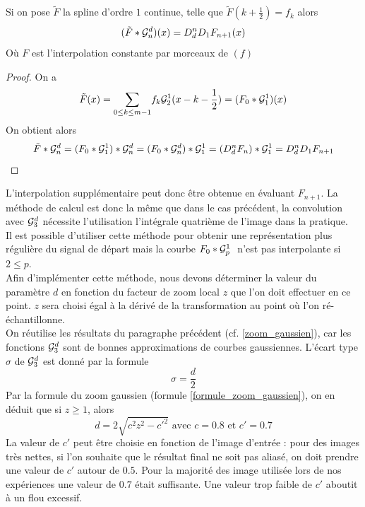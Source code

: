 \begin{prop}
Si on pose $\tilde{F}$ la spline d'ordre $1$ continue, telle que $\tilde{F}(k+\frac{1}{2})=f_k$ alors 
\begin{equation*}
( \tilde{F} * \mathcal{G}_n^d ) (x) = D_d^{n}D_1 F_{n+1}(x)
\end{equation*}
Où $F$ est l'interpolation constante par morceaux de $(f)$ 
\end{prop}
\begin{proof}
On a
\begin{equation*}
\tilde{F}(x)=\displaystyle{\sum_{0\le k \le m-1}} f_k \mathcal{G}_2^1 (x-k-\frac{1}{2})=(F_{0} *\mathcal{G}_1^1 )(x)
\end{equation*}
On obtient alors 
\begin{equation*}
\tilde{F}*\mathcal{G}_n^d=(F_{0}*\mathcal{G}_1^1)*\mathcal{G}_n^d=(F_{0}*\mathcal{G}_n^d)*\mathcal{G}_1^1=(D_d^n F_{n})*\mathcal{G}_1^1= D_d^n D_1 F_{n+1}
\end{equation*}
\end{proof}
L'interpolation supplémentaire peut donc être obtenue en évaluant $F_{n+1}$. La méthode de calcul est donc la même que dans le cas précédent, la convolution avec $\mathcal{G}_3^d$ nécessite l'utilisation l'intégrale quatrième de l'image dans la pratique.\\
Il est possible d'utiliser cette méthode pour obtenir une représentation plus régulière du signal de départ mais la courbe $F_0 * \mathcal{G}_p^1~$ n'est pas interpolante si $2\le p$.\\
Afin d'implémenter cette méthode, nous devons déterminer la valeur du paramètre $d$ en fonction du facteur de zoom local $z$ que l'on doit effectuer en ce point. $z$ sera choisi égal à la dérivé de la transformation au point où l'on ré-échantillonne.\\ 
On réutilise les résultats du paragraphe précédent (cf. \ref{zoom_gaussien}), car les  fonctions $\mathcal{G}_3^d$ sont de bonnes approximations de courbes gaussiennes. L'écart type $\sigma$ de $\mathcal{G}_3^d$ est donné par la formule 
\begin{equation*}
\sigma=\frac{d}{2}
\end{equation*}
Par la formule du zoom gaussien (formule \ref{formule_zoom_gaussien}), on en déduit que si $z\ge 1$, alors
\begin{equation*}
d=2\sqrt{c^2 z^2 - c'^2} \text{ avec } c=0.8 \text{ et } c'=0.7
\end{equation*}
La valeur de $c'$ peut être choisie en fonction de l'image d'entrée : pour des images très nettes, si l'on souhaite que le résultat final ne soit pas aliasé, on doit prendre une valeur de $c'$ autour de $0.5$. Pour la majorité des image utilisée lors de nos expériences une valeur de $0.7$ était suffisante. Une valeur trop faible de $c'$ aboutit à un flou excessif.
